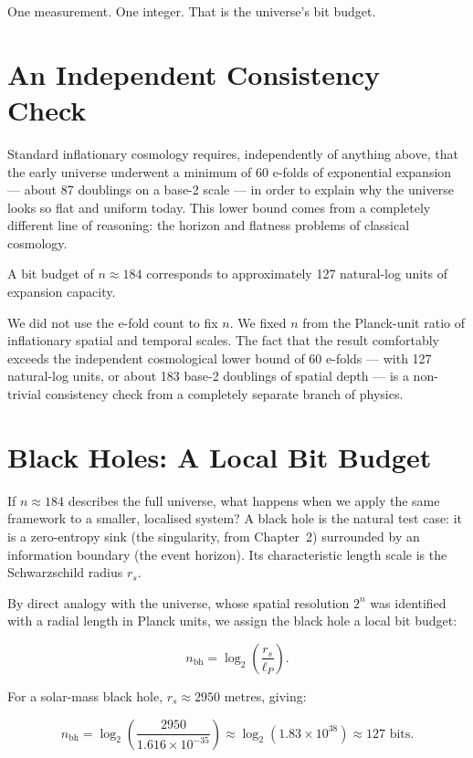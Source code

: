 One measurement. One integer. That is the universe's bit budget.

\section{An Independent Consistency Check}

Standard inflationary cosmology requires, independently of anything above,
that the early universe underwent a minimum of 60 e-folds of exponential
expansion --- about 87 doublings on a base-2 scale --- in order to explain
why the universe looks so flat and uniform today. This lower bound comes
from a completely different line of reasoning: the horizon and flatness
problems of classical cosmology.

A bit budget of $n \approx 184$ corresponds to approximately 127 natural-log
units of expansion capacity.

We did not use the e-fold count to fix $n$. We fixed $n$ from the Planck-unit
ratio of inflationary spatial and temporal scales. The fact that the result
comfortably exceeds the independent cosmological lower bound of 60 e-folds ---
with 127 natural-log units, or about 183 base-2 doublings of spatial depth
--- is a non-trivial consistency check from a completely separate branch of
physics.

\section{Black Holes: A Local Bit Budget}

If $n \approx 184$ describes the full universe, what happens when we apply
the same framework to a smaller, localised system? A black hole is the
natural test case: it is a zero-entropy sink (the singularity, from
Chapter~2) surrounded by an information boundary (the event horizon). Its
characteristic length scale is the Schwarzschild radius $r_s$.

By direct analogy with the universe, whose spatial resolution $2^n$ was
identified with a radial length in Planck units, we assign the black hole
a local bit budget:

\[
n_{\mathrm{bh}} = \log_2\!\left(\frac{r_s}{\ell_P}\right).
\]

For a solar-mass black hole, $r_s \approx 2950$ metres, giving:

\[
n_{\mathrm{bh}} = \log_2\!\left(\frac{2950}{1.616 \times 10^{-35}}\right)
\approx \log_2(1.83 \times 10^{38}) \approx 127 \text{ bits.}
\]

